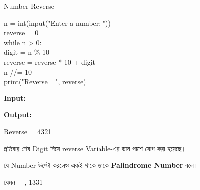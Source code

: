 \begin{codeoutputbox}{Number Reverse}

\noindent
\begin{minipage}[t]{0.53\linewidth}
\codeheading

\begin{english}
\ttfamily
n = int(input("Enter a number: "))\\
reverse = 0\\[0.5mm]
while n > 0:\\
\hspace*{4mm}digit = n \% 10\\
\hspace*{4mm}reverse = reverse * 10 + digit\\
\hspace*{4mm}n //= 10\\[0.5mm]
print("Reverse =", reverse)
\end{english}

\end{minipage}
\hfill
\begin{minipage}[t]{0.43\linewidth}
\outputheading

\textbf{Input:}
\textenglish{}

\medskip

\textbf{Output:}

\textenglish{\ttfamily Reverse = 4321}

\medskip

প্রতিবার শেষ Digit নিয়ে
\textenglish{\ttfamily reverse}
Variable-এর ডান পাশে যোগ করা হয়েছে।

\end{minipage}

\end{codeoutputbox}



যে Number উল্টো করলেও একই থাকে তাকে
\textbf{Palindrome Number} বলে।

যেমন—
\textenglish{, 1331}।

